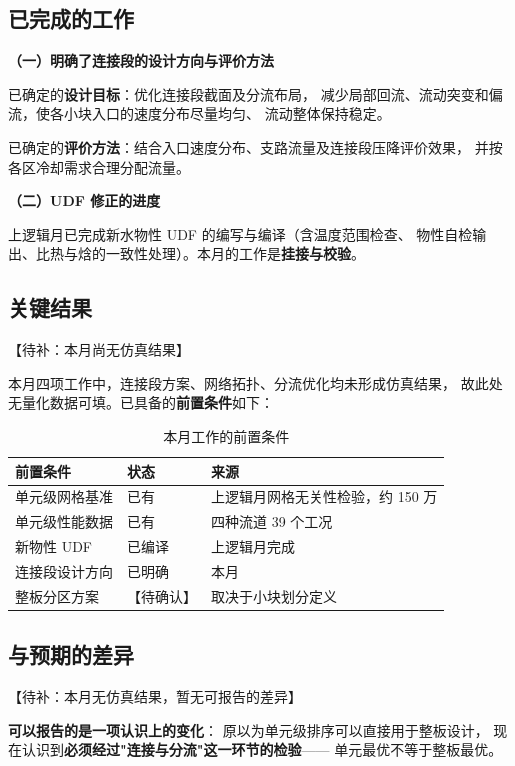 \documentclass[stage2,fontset=fandol]{ydzjreport}
\begin{document}
\subsection{已完成的工作}

\textbf{（一）明确了连接段的设计方向与评价方法}

已确定的\textbf{设计目标}：优化连接段截面及分流布局，
减少局部回流、流动突变和偏流，使各小块入口的速度分布尽量均匀、
流动整体保持稳定。

已确定的\textbf{评价方法}：结合入口速度分布、支路流量及连接段压降评价效果，
并按各区冷却需求合理分配流量。

\textbf{（二）UDF 修正的进度}

上逻辑月已完成新水物性 UDF 的编写与编译（含温度范围检查、
物性自检输出、比热与焓的一致性处理）。本月的工作是\textbf{挂接与校验}。

\subsection{关键结果}

【待补：本月尚无仿真结果】

本月四项工作中，连接段方案、网络拓扑、分流优化均未形成仿真结果，
故此处无量化数据可填。已具备的\textbf{前置条件}如下：

\begin{table}[H]
\centering
\caption{本月工作的前置条件}
\label{tab:ready}
\begin{tabularx}{\textwidth}{@{}Y Y Y@{}}
\toprule
{} 前置条件 & 状态 & 来源 \\
\midrule
单元级网格基准 & 已有 & 上逻辑月网格无关性检验，约 150 万 \\
单元级性能数据 & 已有 & 四种流道 39 个工况 \\
新物性 UDF & 已编译 & 上逻辑月完成 \\
连接段设计方向 & 已明确 & 本月 \\
整板分区方案 & 【待确认】 & 取决于小块划分定义 \\
\bottomrule
\end{tabularx}
\end{table}

\subsection{与预期的差异}

【待补：本月无仿真结果，暂无可报告的差异】

\textbf{可以报告的是一项认识上的变化}：
原以为单元级排序可以直接用于整板设计，
现在认识到\textbf{必须经过"连接与分流"这一环节的检验}——
单元最优不等于整板最优。
\end{document}
